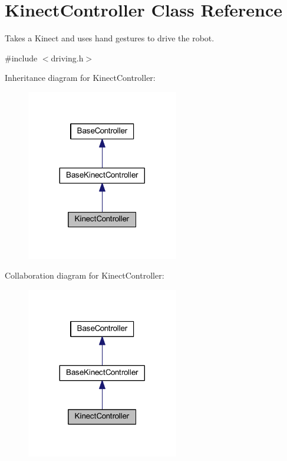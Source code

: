 \hypertarget{class_kinect_controller}{\section{\-Kinect\-Controller \-Class \-Reference}
\label{class_kinect_controller}
}


\-Takes a \-Kinect and uses hand gestures to drive the robot.  




{\ttfamily \#include $<$driving.\-h$>$}



\-Inheritance diagram for \-Kinect\-Controller\-:\nopagebreak
\begin{figure}[H]
\begin{center}
\leavevmode
\includegraphics[width=188pt]{class_kinect_controller__inherit__graph}
\end{center}
\end{figure}


\-Collaboration diagram for \-Kinect\-Controller\-:\nopagebreak
\begin{figure}[H]
\begin{center}
\leavevmode
\includegraphics[width=188pt]{class_kinect_controller__coll__graph}
\end{center}
\end{figure}

